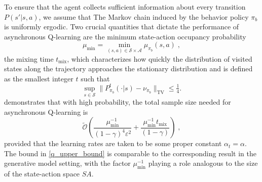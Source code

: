 \documentclass{article}
\numberwithin{equation}{section}
\newcommand{\cA}{\mathcal{A}}
\newcommand{\cS}{\mathcal{S}}
\newcommand{\eqsp}{\;}
\begin{document}
To ensure that the agent collects sufficient information about every transition \(P(s'|s,a)\), we assume that The Markov chain induced by the behavior policy \(\pi_b\) is uniformly ergodic.
Two crucial quantities that dictate the performance of asynchronous Q-learning are the minimum state-action occupancy probability
\[\mu_{\text{min}} = \min_{(s,a)\in\cS\times\cA} \mu_{{\pi_b}}(s,a)\eqsp,\]
the mixing time \(t_{\operatorname{mix}}\), which characterizes how quickly the distribution of visited states along the trajectory approaches the stationary distribution and is defined as the smallest integer $t$ such that
\[
\sup_{s\in\cS}
\|
P_{\pi_b}^t(\cdot|s)
-
\nu_{\pi_b}
\|_{\mathrm{TV}}
\le \tfrac14.
\] \cite{li2024q} demonstrates that with high probability, the total sample size needed for asynchronous
Q-learning is 
\begin{equation}\label{q_upper_bound}
    \widetilde{\mathcal{O}}\left(\frac{\mu_{\operatorname{min}}^{-1}}{(1-\gamma)^4 \varepsilon^2} + \frac{\mu_{\operatorname{min}}^{-1}t_{\operatorname{mix}}}{(1-\gamma)}\right)\eqsp,
\end{equation}
provided that the learning rates are taken to be some proper constant $\alpha_{t} = \alpha$.  The bound in \eqref{q_upper_bound} is comparable to the corresponding result in the generative model setting, with the factor \(\mu_{\operatorname{min}}^{-1}\) playing a role analogous to the size of the state-action space 
\(SA\).
\end{document}
